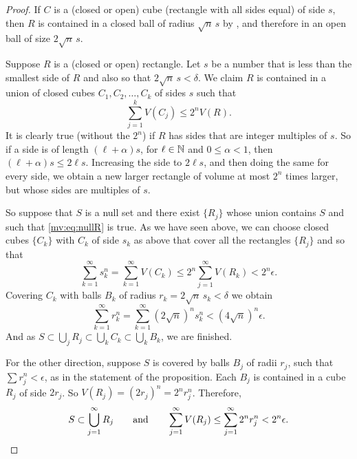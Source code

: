 \begin{proof}
If $C$ is a (closed or open) cube (rectangle with all sides
equal) of side $s$, then $R$ is contained in a closed ball of radius
$\sqrt{n}\, s$ by , and therefore
in an open ball of size $2 \sqrt{n}\, s$.

Suppose $R$ is a (closed or open) rectangle.
Let $s$ be a number that is less than the smallest side of $R$ and also
so that $2\sqrt{n} \, s < \delta$.
We claim $R$ is contained in
a union of closed cubes $C_1, C_2, \ldots, C_k$ of sides $s$ such that
\begin{equation*}
\sum_{j=1}^k V(C_j) \leq 2^n V(R) .
\end{equation*}
It is clearly true (without the $2^n$) if $R$ has sides that are
integer multiples of $s$.  So if a side is of length $(\ell+\alpha) s$, for
$\ell \in {\mathbb{N}}$ and $0 \leq \alpha < 1$, then
$(\ell+\alpha)s \leq 2\ell s$.  Increasing the side to $2\ell s$,
and then doing the same for every side, we obtain a new larger
rectangle of volume at most $2^n$ times larger, but whose sides are
multiples of $s$.

So suppose that $S$ is a null set and
there exist $\{ R_j \}$ whose union contains $S$ and such that
\eqref{mv:eq:nullR} is true.  As we have seen above, we can choose closed
cubes $\{ C_k \}$ with $C_k$ of side $s_k$ as above that cover all the rectangles $\{ R_j \}$
and so that
\begin{equation*}
\sum_{k=1}^\infty s_k^n =
\sum_{k=1}^\infty V(C_k) \leq
2^n \sum_{j=1}^\infty V(R_k)
< 2^n \epsilon.
\end{equation*}
Covering $C_k$ with balls $B_k$ of radius $r_k = 2\sqrt{n} \, s_k < \delta$
we obtain 
\begin{equation*}
\sum_{k=1}^\infty r_k^n
=
\sum_{k=1}^\infty {(2\sqrt{n})}^n s_k^n
<
{(4\sqrt{n})}^n \epsilon .
\end{equation*}
And as $S \subset\bigcup_{j} R_j \subset \bigcup_{k} C_k \subset \bigcup_{k}
B_k$, we are finished.

For the other direction, suppose $S$ is covered by balls $B_j$
of radii $r_j$, such that $\sum r_j^n < \epsilon$,
as in the statement of the proposition.
Each $B_j$ is contained in a cube $R_j$ of side $2r_j$.
So $V(R_j) = {(2 r_j)}^n = 2^n r_j^n$.  Therefore,
\begin{equation*}
S \subset \bigcup_{j=1}^\infty R_j \qquad \text{and} \qquad
\sum_{j=1}^\infty V(R_j)
\leq
\sum_{j=1}^\infty 2^n r_j^n < 2^n \epsilon. \qedhere
\end{equation*}
\end{proof}

